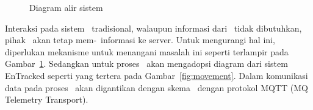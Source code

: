\noindent
\begin{figure}
    \centering
    \caption{Diagram alir sistem \tracking}
\label{fig:tracking}
\end{figure}

Interaksi pada sistem \pubsub~tradisional, walaupun informasi dari \publisher~tidak
dibutuhkan, pihak \publisher~akan tetap mem-\publish~informasi ke server. Untuk
mengurangi hal ini, diperlukan mekanisme untuk menangani masalah ini seperti
terlampir pada Gambar~\ref{fig:tracking}. Sedangkan untuk proses \tracking~akan
mengadopsi diagram dari sistem EnTracked seperti yang tertera pada
Gambar~\ref{fig:movement}. Dalam komunikasi data pada proses \tracking~akan
digantikan dengan skema \pubsub~dengan protokol MQTT (MQ Telemetry Transport).

